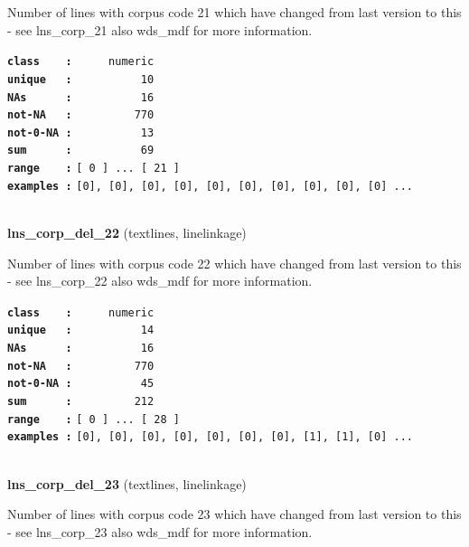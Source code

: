 \documentclass[]{article}
\begin{document}
Number of lines with corpus code 21 which have changed from last version
to this - see lns\_corp\_21 also wds\_mdf for more information.

\textbf{\texttt{class\ \ \ \ :}} \texttt{~~~~~numeric}\\
\textbf{\texttt{unique\ \ \ :}} \texttt{~~~~~~~~~~10}\\
\textbf{\texttt{NAs\ \ \ \ \ \ :}} \texttt{~~~~~~~~~~16}\\
\textbf{\texttt{not-NA\ \ \ :}} \texttt{~~~~~~~~~770}\\
\textbf{\texttt{not-0-NA\ :}} \texttt{~~~~~~~~~~13}\\
\textbf{\texttt{sum\ \ \ \ \ \ :}} \texttt{~~~~~~~~~~69}\\
\textbf{\texttt{range\ \ \ \ :}}
\texttt{{[}\ 0\ {]}\ ...\ {[}\ 21\ {]}}\\
\textbf{\texttt{examples\ :}}
\texttt{{[}0{]},\ {[}0{]},\ {[}0{]},\ {[}0{]},\ {[}0{]},\ {[}0{]},\ {[}0{]},\ {[}0{]},\ {[}0{]},\ {[}0{]}\ ...}\\

~

\textbf{lns\_corp\_del\_22} (textlines, linelinkage)

Number of lines with corpus code 22 which have changed from last version
to this - see lns\_corp\_22 also wds\_mdf for more information.

\textbf{\texttt{class\ \ \ \ :}} \texttt{~~~~~numeric}\\
\textbf{\texttt{unique\ \ \ :}} \texttt{~~~~~~~~~~14}\\
\textbf{\texttt{NAs\ \ \ \ \ \ :}} \texttt{~~~~~~~~~~16}\\
\textbf{\texttt{not-NA\ \ \ :}} \texttt{~~~~~~~~~770}\\
\textbf{\texttt{not-0-NA\ :}} \texttt{~~~~~~~~~~45}\\
\textbf{\texttt{sum\ \ \ \ \ \ :}} \texttt{~~~~~~~~~212}\\
\textbf{\texttt{range\ \ \ \ :}}
\texttt{{[}\ 0\ {]}\ ...\ {[}\ 28\ {]}}\\
\textbf{\texttt{examples\ :}}
\texttt{{[}0{]},\ {[}0{]},\ {[}0{]},\ {[}0{]},\ {[}0{]},\ {[}0{]},\ {[}0{]},\ {[}1{]},\ {[}1{]},\ {[}0{]}\ ...}\\

~

\textbf{lns\_corp\_del\_23} (textlines, linelinkage)

Number of lines with corpus code 23 which have changed from last version
to this - see lns\_corp\_23 also wds\_mdf for more information.
\end{document}
